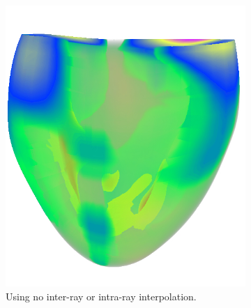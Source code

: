 \begin{figure}
\centering
\begin{subfigure}[b]{0.4\textwidth}
    \includegraphics[width=\abfboximagewidth]{figures/contributions/fem/heart-5.jpg}
    \caption{Using no inter-ray or intra-ray interpolation.}
    \label{contributions:fem:raw}
\end{subfigure}
\hspace{2cm}
\begin{subfigure}[b]{0.4\textwidth}

\end{subfigure}
\end{figure}
